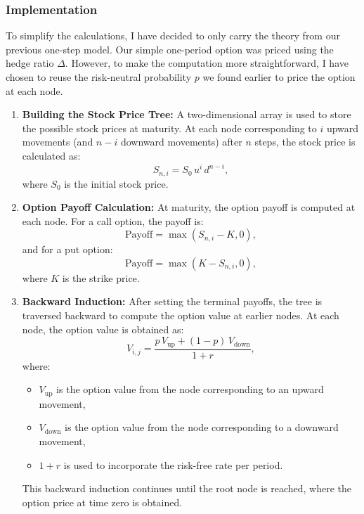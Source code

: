 \documentclass{article}
\begin{document}
    \subsubsection{Implementation}

    To simplify the calculations, I have decided to only carry the theory from our previous one-step model.
    Our simple one-period option was priced using the hedge ratio \(\Delta\).
    However, to make the computation more straightforward, I have chosen to reuse the risk-neutral probability \(p\) we found earlier to price the option at each node.

    \begin{enumerate}

        \item \textbf{Building the Stock Price Tree:} A two-dimensional array is used to store the possible stock prices at maturity. At each node corresponding to \( i \) upward movements (and \( n-i \) downward movements) after \( n \) steps, the stock price is calculated as:
        \[
        S_{n,i} = S_0 \, u^i \, d^{n-i},
        \]
        where \( S_0 \) is the initial stock price.

        \item \textbf{Option Payoff Calculation:} At maturity, the option payoff is computed at each node. For a call option, the payoff is:
        \[
        \text{Payoff} = \max(S_{n,i} - K, 0),
        \]
        and for a put option:
        \[
        \text{Payoff} = \max(K - S_{n,i}, 0),
        \]
        where \( K \) is the strike price.

        \item \textbf{Backward Induction:} After setting the terminal payoffs, the tree is traversed backward to compute the option value at earlier nodes. At each node, the option value is obtained as:
        \[
        V_{i,j} = \frac{p \, V_{\text{up}} + (1 - p) \, V_{\text{down}}}{1 + r},
        \]
        where:
        \begin{itemize}
            \item \( V_{\text{up}} \) is the option value from the node corresponding to an upward movement,
            \item \( V_{\text{down}} \) is the option value from the node corresponding to a downward movement,
            \item \( 1 + r \) is used to incorporate the risk-free rate per period.
        \end{itemize}
        This backward induction continues until the root node is reached, where the option price at time zero is obtained.
    \end{enumerate}
\end{document}
